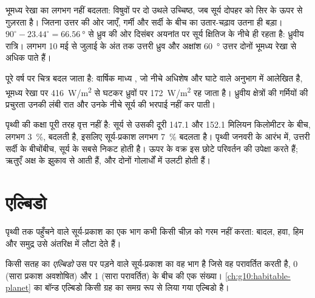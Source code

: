 \begin{remark}[वक्रों को पढ़ना]\label{rem:g10:earth-energy-budget:curves}
भूमध्य रेखा का  लगभग नहीं बदलता: विषुवों पर दो उथले उच्चिष्ठ, जब सूर्य
दोपहर को सिर के ऊपर से गुज़रता है। जितना उत्तर की ओर जाएँ, गर्मी और सर्दी के बीच का
उतार-चढ़ाव उतना ही बड़ा। $90^\circ - 23.44^\circ = \qty{66.56}{\degree}$ से ध्रुव की
ओर दिसंबर अयनांत पर सूर्य क्षितिज के नीचे ही रहता है: ध्रुवीय रात्रि। लगभग 10 मई से
जुलाई के अंत तक उत्तरी ध्रुव और अक्षांश \qty{60}{\degree} उत्तर दोनों भूमध्य रेखा से अधिक
पाते हैं।
\end{remark}

पूरे वर्ष पर चित्र बदल जाता है: वार्षिक माध्य , जो नीचे अधिशेष और घाटे वाले अनुभाग
में आलेखित है, भूमध्य रेखा पर \qty{416}{W/m^2} से घटकर
ध्रुवों पर \qty{172}{W/m^2} रह जाता है। ध्रुवीय क्षेत्रों की गर्मियों की प्रचुरता उनकी लंबी
रात और उनके नीचे सूर्य की भरपाई नहीं कर पाती।

\begin{remark}[सूर्य से दूरी ऋतुएँ नहीं बनाती]\label{rem:g10:earth-energy-budget:distance}
पृथ्वी की कक्षा पूरी तरह वृत्त नहीं है: सूर्य से उसकी दूरी
\num{147.1} और \num{152.1} मिलियन किलोमीटर के बीच, लगभग
\qty{3}{\percent}, बदलती है, इसलिए सूर्य-प्रकाश लगभग \qty{7}{\percent} बदलता है।
पृथ्वी जनवरी के आरंभ में, उत्तरी सर्दी के बीचोंबीच, सूर्य के सबसे निकट होती है। ऊपर के वक्र
इस छोटे परिवर्तन की उपेक्षा करते हैं; ऋतुएँ अक्ष के झुकाव से आती हैं, और दोनों गोलार्धों में
उलटी होती हैं।
\end{remark}

\section{एल्बिडो}

पृथ्वी तक पहुँचने वाले सूर्य-प्रकाश का एक भाग कभी किसी चीज़ को गरम नहीं करता: बादल, हवा,
हिम और समुद्र उसे अंतरिक्ष में लौटा देते हैं।

\begin{definition}[एल्बिडो]\label{def:g10:earth-energy-budget:albedo}
किसी सतह का \emph{एल्बिडो} उस पर पड़ने वाले सूर्य-प्रकाश का वह भाग है
जिसे वह परावर्तित करती है, 0 (सारा प्रकाश अवशोषित) और 1 (सारा परावर्तित) के बीच
की एक संख्या। \cref{ch:g10:habitable-planet} का बॉन्ड एल्बिडो
किसी ग्रह का समग्र रूप से लिया गया एल्बिडो है।
\end{definition}

